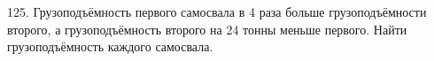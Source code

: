 125. Грузоподъёмность первого самосвала в 4 раза больше грузоподъёмности второго, а грузоподъёмность второго на 24 тонны меньше первого. Найти грузоподъёмность каждого самосвала.\\
